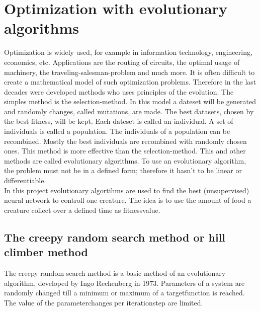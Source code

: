 \documentclass[10pt,a4paper,DIV=11]{scrreprt}
\begin{document}


\chapter{Optimization with evolutionary algorithms}
Optimization is widely used, for example in information technology, engineering,
economics, etc. Applications are the routing of circuits, the optimal usage of machinery,
the traveling-salesman-problem and much more. It is often difficult to create a mathematical
model of such optimization problems. Therefore in the last decades were developed methods who
uses principles of the evolution.
The simples method is the selection-method. In this model a dateset will be generated and randomly
changes, called mutations, are made. The best datasets, chosen by the best fitness, will be kept.
Each dateset is called an individual. A set of individuals is called a population. The individuals
of a population can be recombined. Mostly the best individuals are recombined with randomly chosen
ones. This method is more effective than the selection-method. This and other methods are  called
evolutionary algorithms. To use an evolutionary algorithm, the problem must not be in a defined form;
therefore it hasn't to be linear or differentiable. \\

In this project evolutionary algortihms are used to find the best 
(unsupervised) neural network to controll one creature. The idea is to use the amount of food a creature collect over a defined time as fitnessvalue.

\section{The creepy random search method or hill climber method}
The creepy random search method is a basic method of an evolutionary algorithm, developed by Ingo Rechenberg in 1973. %
Parameters of a system are randomly changed till a minimum or maximum of a targetfunction is reached. The value of the parameterchanges per iterationstep are limited. \\
\end{document}
